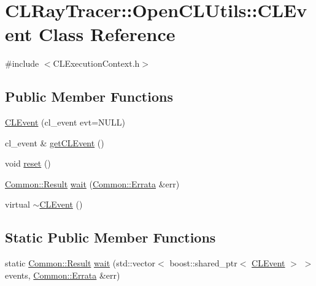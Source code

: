 \hypertarget{class_c_l_ray_tracer_1_1_open_c_l_utils_1_1_c_l_event}{}\section{C\+L\+Ray\+Tracer\+:\+:Open\+C\+L\+Utils\+:\+:C\+L\+Event Class Reference}
\label{class_c_l_ray_tracer_1_1_open_c_l_utils_1_1_c_l_event}


{\ttfamily \#include $<$C\+L\+Execution\+Context.\+h$>$}

\subsection*{Public Member Functions}
\begin{DoxyCompactItemize}
\item 
\hyperlink{class_c_l_ray_tracer_1_1_open_c_l_utils_1_1_c_l_event_a3ad35804ee316b14c479ab511e61e35d}{C\+L\+Event} (cl\+\_\+event evt=N\+U\+LL)
\item 
cl\+\_\+event \& \hyperlink{class_c_l_ray_tracer_1_1_open_c_l_utils_1_1_c_l_event_ade18279a8b719358ad9c6895133a1f58}{get\+C\+L\+Event} ()
\item 
void \hyperlink{class_c_l_ray_tracer_1_1_open_c_l_utils_1_1_c_l_event_a755beac868756c6587e48a0ee752d8da}{reset} ()
\item 
\hyperlink{_errata_8h_a389396702f1aff6e71eb21328b0775c1}{Common\+::\+Result} \hyperlink{class_c_l_ray_tracer_1_1_open_c_l_utils_1_1_c_l_event_a8cc2dca0f1cd490a8f9e2cf4ad7c6d33}{wait} (\hyperlink{class_c_l_ray_tracer_1_1_common_1_1_errata}{Common\+::\+Errata} \&err)
\item 
virtual \hyperlink{class_c_l_ray_tracer_1_1_open_c_l_utils_1_1_c_l_event_a574105230c5f48321244e14a7d2e1fc0}{$\sim$\+C\+L\+Event} ()
\end{DoxyCompactItemize}
\subsection*{Static Public Member Functions}
\begin{DoxyCompactItemize}
\item 
static \hyperlink{_errata_8h_a389396702f1aff6e71eb21328b0775c1}{Common\+::\+Result} \hyperlink{class_c_l_ray_tracer_1_1_open_c_l_utils_1_1_c_l_event_abe75eadabc30a738f649712b48e09fb4}{wait} (std\+::vector$<$ boost\+::shared\+\_\+ptr$<$ \hyperlink{class_c_l_ray_tracer_1_1_open_c_l_utils_1_1_c_l_event}{C\+L\+Event} $>$ $>$ events, \hyperlink{class_c_l_ray_tracer_1_1_common_1_1_errata}{Common\+::\+Errata} \&err)
\end{DoxyCompactItemize}
